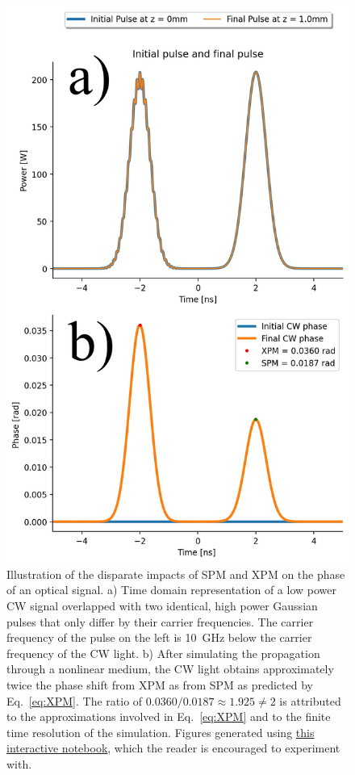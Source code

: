 \begin{figure}
    \centering
    \includegraphics[width=0.8\linewidth]{figures/XPM_combined.png}
    \caption{Illustration of the disparate impacts of SPM and XPM on the phase of an optical signal. a) Time domain representation of a low power CW signal overlapped with two identical, high power Gaussian pulses that only differ by their carrier frequencies. The carrier frequency of the pulse on the left is 10~GHz below the carrier frequency of the CW light. b) After simulating the propagation through a nonlinear medium, the CW light obtains approximately twice the phase shift from XPM as from SPM as predicted by Eq.~\ref{eq:XPM}. The ratio of $0.0360/0.0187\approx 1.925\neq2$ is attributed to the approximations involved in Eq.~\ref{eq:XPM} and to the finite time resolution of the simulation. Figures generated using \href{https://colab.research.google.com/drive/1aIRradfOZGN7JYUhbtYJdVzJwAZoYoUe?usp=sharing}{this interactive notebook}, which the reader is encouraged to experiment with.}
    \label{fig:XPM}
\end{figure}






